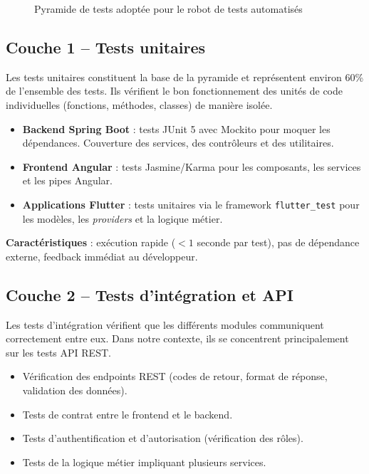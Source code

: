 \begin{figure}[H]
\caption{Pyramide de tests adoptée pour le robot de tests automatisés}
\label{fig:pyramide-tests}
\end{figure}

\subsection{Couche 1 -- Tests unitaires}
\label{subsec:tests-unitaires}

Les tests unitaires constituent la base de la pyramide et représentent environ 60\% de l'ensemble des tests. Ils vérifient le bon fonctionnement des unités de code individuelles (fonctions, méthodes, classes) de manière isolée.

\begin{itemize}[nosep]
    \item \textbf{Backend Spring Boot} : tests JUnit 5 avec Mockito pour moquer les dépendances. Couverture des services, des contrôleurs et des utilitaires.
    \item \textbf{Frontend Angular} : tests Jasmine/Karma pour les composants, les services et les pipes Angular.
    \item \textbf{Applications Flutter} : tests unitaires via le framework \texttt{flutter\_test} pour les modèles, les \textit{providers} et la logique métier.
\end{itemize}

\textbf{Caractéristiques} : exécution rapide ($< 1$ seconde par test), pas de dépendance externe, feedback immédiat au développeur.

\subsection{Couche 2 -- Tests d'intégration et API}
\label{subsec:tests-api}

Les tests d'intégration vérifient que les différents modules communiquent correctement entre eux. Dans notre contexte, ils se concentrent principalement sur les tests API REST.

\begin{itemize}[nosep]
    \item Vérification des endpoints REST (codes de retour, format de réponse, validation des données).
    \item Tests de contrat entre le frontend et le backend.
    \item Tests d'authentification et d'autorisation (vérification des rôles).
    \item Tests de la logique métier impliquant plusieurs services.
\end{itemize}

